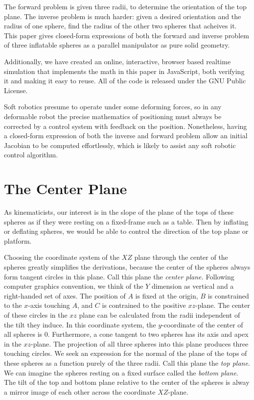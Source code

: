 \documentclass{article}
\begin{document}
The forward problem is given three radii,
to determine the orientation of the top plane.
The inverse problem is much harder: given a desired orientation and the radius of one
sphere, find the radius of the other two spheres that acheives it.
This paper gives closed-form expressions of both
the forward and inverse problem of three inflatable spheres as a parallel manipulator as pure solid geometry.

Additionally, we have created an online, interactive, browser based realtime simulation\cite{softrobotcalc} that implements
the math in this paper in JavaScript, both verifying it and making it easy to reuse.
All of the code is released under the GNU Public License\cite{gplv3}.

Soft robotics presume to operate under some deforming forces, so in any deformable robot the precise mathematics
of positioning must always be corrected by a control system with feedback on the position.
Nonetheless, having a closed-form expression of both the inverse and forward problem allow
an initial Jacobian to be computed effortlessly, which is likely to assist any soft robotic control algorithm.

\section{The Center Plane}

As kinematicists,
our interest is in the slope of the plane of the tops of these spheres
as if they were resting on a fixed-frame such as a table. Then by inflating or deflating spheres,
we would be able to control the direction of the top plane or platform.

Choosing the coordinate system of the $XZ$ plane through the center of the spheres greatly
simplifies the derivations, because the center of the spheres always form tangent circles
in this plane. Call this plane the {\em center plane.}
Following computer graphics convention, we think of the $Y$ dimension as vertical and a
right-handed set of axes.
The position of $A$ is fixed at the origin, $B$ is constrained to the $x$-axis touching $A$, and
$C$ is contrained to the positive $xz$-plane. The center of these circles in the $xz$ plane can be
calculated from the radii independent of the tilt they induce.
In this coordinate system, the $y$-coordinate of the center of all spheres is $0$.
Furthermore, a cone tangent to two spheres has its axis and apex in the $xz$-plane.
The projection of all three spheres into this plane produces three touching circles.
We seek an expression for the normal of the plane of the tops of these spheres as a function
purely of the three radii. Call this plane the {\em top plane}.
We can imagine the spheres resting on a fixed surface called the {\em bottom plane}.
The tilt of the top and bottom plane relative to the center of the spheres
is alway a mirror image of each other across the coordinate $XZ$-plane.
\end{document}
